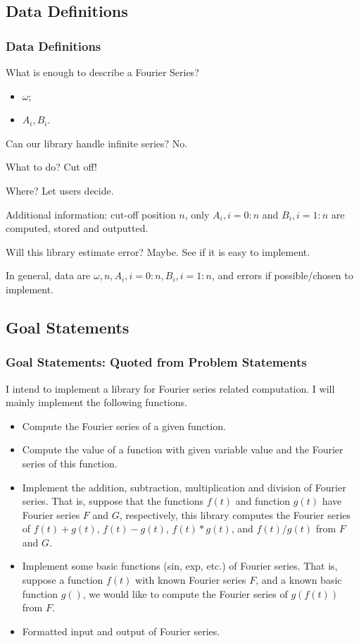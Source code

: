 \documentclass{beamer}
\begin{document}
	\subsection{Data Definitions}
	\begin{frame}
	\frametitle{Data Definitions}
	What is enough to describe a Fourier Series?
\begin{itemize}
	\item $\omega$;
	\item $A_i, B_i$.
\end{itemize}
Can our library handle infinite series? No.

What to do? Cut off!

Where? Let users decide.

Additional information: cut-off position $n$, only $A_i, i=0:n$ and $B_i, i=1:n$ are computed, stored and outputted.

Will this library estimate error? Maybe. See if it is easy to implement.

In general, data are $\omega, n, A_i, i=0:n, B_i, i=1:n$, and errors if possible/chosen to implement.
	\end{frame}

	\subsection{Goal Statements}
	\begin{frame}
		\frametitle{Goal Statements: Quoted from Problem Statements}
			I intend to implement a library for Fourier series related computation. I will mainly implement the following functions.
		\begin{itemize}
			\item Compute the Fourier series of a given function.
			\item Compute the value of a function with given variable value and the Fourier series of this function.
			\item Implement the addition, subtraction, multiplication and division of Fourier series. That is, suppose that the functions $f(t)$ and function $g(t)$ have Fourier series $F$ and $G$, respectively, this library computes the Fourier series of $f(t)+g(t)$, $f(t)-g(t)$, $f(t)*g(t)$, and $f(t)/g(t)$ from $F$ and $G$. 
			\item Implement some basic functions (sin, exp, etc.) of Fourier series. That is, suppose a function $f(t)$ with known Fourier series $F$, and a known basic function $g()$, we would like to compute the Fourier series of $g(f(t))$ from $F$. 
			\item Formatted input and output of Fourier series. 
		\end{itemize}
	\end{frame}
\end{document}
